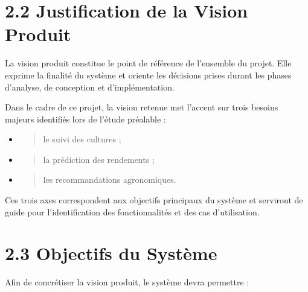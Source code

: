 \documentclass[
]{book}
\begin{document}
\hypertarget{justification-de-la-vision-produit}{%
\section{2.2 Justification de la Vision
Produit}\label{justification-de-la-vision-produit}}

La vision produit constitue le point de référence de l'ensemble du
projet. Elle exprime la finalité du système et oriente les décisions
prises durant les phases d'analyse, de conception et d'implémentation.

Dans le cadre de ce projet, la vision retenue met l'accent sur trois
besoins majeurs identifiés lors de l'étude préalable :

\begin{itemize}
\item
  \begin{quote}
  le suivi des cultures ;
  \end{quote}
\item
  \begin{quote}
  la prédiction des rendements ;
  \end{quote}
\item
  \begin{quote}
  les recommandations agronomiques.
  \end{quote}
\end{itemize}

Ces trois axes correspondent aux objectifs principaux du système et
serviront de guide pour l'identification des fonctionnalités et des cas
d'utilisation.

\hypertarget{objectifs-du-systuxe8me}{%
\section{2.3 Objectifs du Système}\label{objectifs-du-systuxe8me}}

Afin de concrétiser la vision produit, le système devra permettre :
\end{document}
